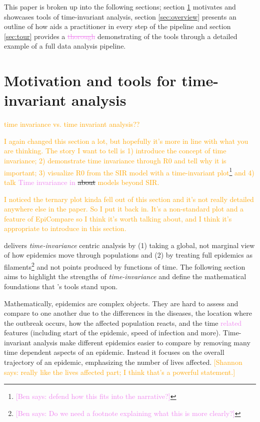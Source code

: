 \documentclass[
  shortnames]{jss}
\begin{document}
This paper is broken up into the following sections; section
\ref{sec:time-invariant} motivates and showcases tools of time-invariant
analysis, section \ref{sec:overview} presents an outline of how
 aids a practitioner in every step of the pipeline and
section \ref{sec:tour} provides a \textcolor{violet}{\sout{thorough}}
demonstrating of the tools through a detailed example of a full data
analysis pipeline.

\section[Time-invariant]{Motivation and tools for time-invariant
analysis}\label{sec:time-invariant}

\textcolor{orange}{time invariance vs. time invariant analysis??}

\textcolor{orange}{I again changed this section a lot, but hopefully it's more in line with what you are thinking.  The story I want to tell is 1) introduce the concept of time invariance; 2) demonstrate time invariance through R0 and tell why it is important; 3) visualize R0 from the SIR model with a time-invariant plot\footnote{\textcolor{violet}{[Ben says: defend how this fits into the narrative?]}} and 4) talk }\textcolor{violet}{Time invariance in}
\sout{about}\textcolor{orange}{ models beyond SIR.}

\textcolor{orange}{I noticed the ternary plot kinda fell out of this section and it's not really detailed anywhere else in the paper.  So I put it back in.  It's a non-standard plot and a feature of EpiCompare so I think it's worth talking about, and I think it's appropriate to introduce in this section.}

 delivers \textit{time-invariance} centric analysis by
(1) taking a global, not marginal view of how epidemics move through
populations and (2) by treating full epidemics as filaments\footnote{\textcolor{violet}{[Ben says: Do we need a footnote explaining what this is more clearly?]}}
and not points produced by functions of time. The following section aims
to highlight the strengths of \textit{time-invariance} and define the
mathematical foundations that 's tools stand upon.

Mathematically, epidemics are complex objects. They are hard to assess
and compare to one another due to the differences in the diseases, the
location where the outbreak occurs, how the affected population reacts,
and the time \textcolor{violet}{related} features (including start of
the epidemic, speed of infection and more). Time-invariant analysis make
different epidemics easier to compare by removing many time dependent
aspects of an epidemic. Instead it focuses on the overall trajectory of
an epidemic, emphasizing the number of lives affected.
\textcolor{orange}{[Shannon says: really like the lives affected part; I think that's a powerful statement.]}
\end{document}
